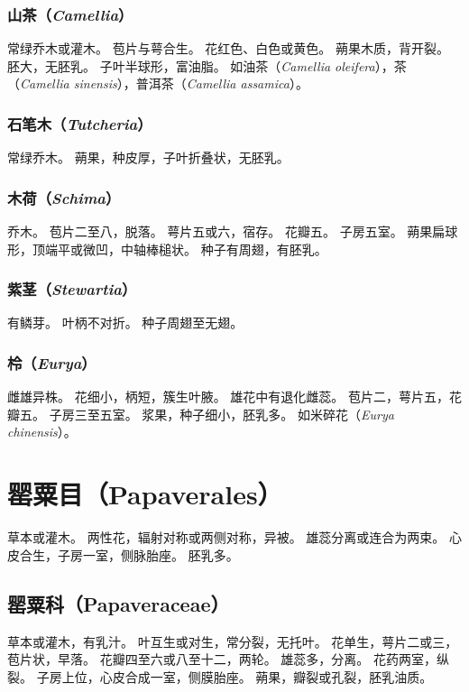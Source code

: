 \documentclass[11pt]{article}
\begin{document}
\begin{sloppypar}
\subsubsection{山茶（\textit{Camellia}）}
常绿乔木或灌木。
苞片与萼合生。
花红色、白色或黄色。
蒴果木质，背开裂。
胚大，无胚乳。
子叶半球形，富油脂。
如油茶（\textit{Camellia oleifera}），茶（\textit{Camellia sinensis}），普洱茶（\textit{Camellia assamica}）。

\subsubsection{石笔木（\textit{Tutcheria}）}
常绿乔木。
蒴果，种皮厚，子叶折叠状，无胚乳。

\subsubsection{木荷（\textit{Schima}）}
乔木。
苞片二至八，脱落。
萼片五或六，宿存。
花瓣五。
子房五室。
蒴果扁球形，顶端平或微凹，中轴棒槌状。
种子有周翅，有胚乳。

\subsubsection{紫茎（\textit{Stewartia}）}
有鳞芽。
叶柄不对折。
种子周翅至无翅。

\subsubsection{柃（\textit{Eurya}）}
雌雄异株。
花细小，柄短，簇生叶腋。
雄花中有退化雌蕊。
苞片二，萼片五，花瓣五。
子房三至五室。
浆果，种子细小，胚乳多。
如米碎花（\textit{Eurya chinensis}）。

\section{罂粟目（Papaverales）}
草本或灌木。
两性花，辐射对称或两侧对称，异被。
雄蕊分离或连合为两束。
心皮合生，子房一室，侧脉胎座。
胚乳多。

\subsection{罂粟科（Papaveraceae）}
草本或灌木，有乳汁。
叶互生或对生，常分裂，无托叶。
花单生，萼片二或三，苞片状，早落。
花瓣四至六或八至十二，两轮。
雄蕊多，分离。
花药两室，纵裂。
子房上位，心皮合成一室，侧膜胎座。
蒴果，瓣裂或孔裂，胚乳油质。


\end{sloppypar}
\end{document}
